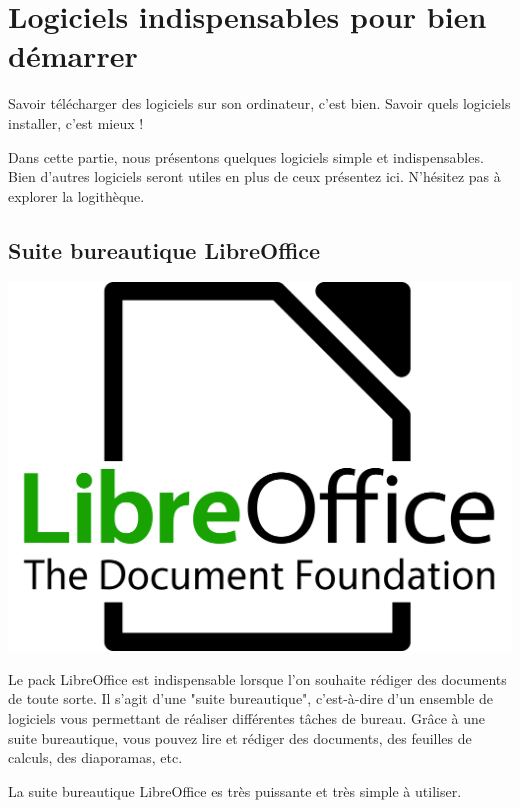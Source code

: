 \documentclass[12pt]{book}
\begin{document}
\section{Logiciels indispensables pour bien démarrer}
	Savoir télécharger des logiciels sur son ordinateur, c'est bien.
	Savoir quels logiciels installer, c'est mieux !\par
	Dans cette partie, nous présentons quelques logiciels simple et indispensables.
	Bien d'autres logiciels seront utiles en plus de ceux présentez ici.
	N'hésitez pas à explorer la logithèque.
	\subsection{Suite bureautique LibreOffice}\label{sec:libreoffice}
		\hspace{-.8cm}
		\begin{minipage}[c]{0.3\textwidth}
			\centering
			\includegraphics[width=\textwidth]{include/lo_logo.png}
		\end{minipage}
		\begin{minipage}[c]{.65\textwidth}
			\hspace{.4cm}
			Le pack LibreOffice est indispensable lorsque l'on souhaite rédiger des documents de toute sorte.
			Il s'agit d'une "suite bureautique", c'est-à-dire d'un ensemble de logiciels vous permettant de réaliser différentes tâches de bureau.
			Grâce à une suite bureautique, vous pouvez lire et rédiger des documents, des feuilles de calculs, des diaporamas, etc.
		\end{minipage}\par
			La suite bureautique LibreOffice es très puissante et très simple à utiliser.
\end{document}
